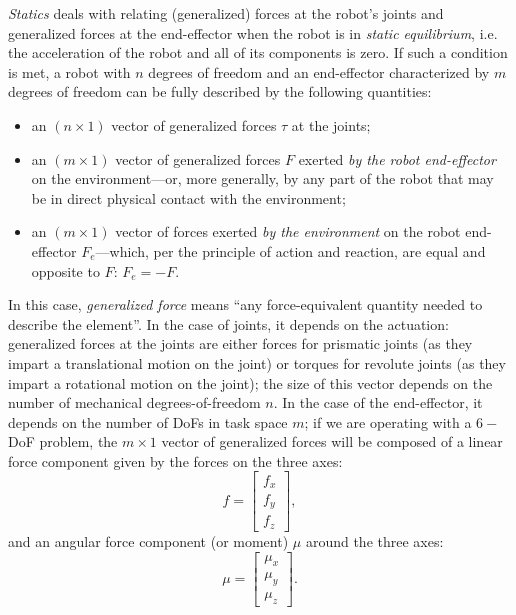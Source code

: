 \textsl{Statics} deals with relating (generalized) forces at the robot's joints and generalized forces at the end-effector when the robot is in \textsl{static equilibrium}, i.e. the acceleration of the robot and all of its components is zero.
If such a condition is met, a robot with $n$ degrees of freedom and an end-effector characterized by $m$ degrees of freedom can be fully described by the following quantities:
\begin{itemize}
    \item an $\left( n \times 1 \right)$ vector of generalized forces $\tau$ at the joints;
    \item an $\left( m \times 1 \right)$ vector of generalized forces $F$ exerted \textsl{by the robot end-effector} on the environment---or, more generally, by any part of the robot that may be in direct physical contact with the environment;
    \item an $\left( m \times 1 \right)$ vector of forces exerted \textsl{by the environment} on the robot end-effector $F_e$---which, per the principle of action and reaction, are equal and opposite to $F$: $F_e=-F$.
\end{itemize}
In this case, \textsl{generalized force} means ``any force-equivalent quantity needed to describe the element''.
In the case of joints, it depends on the actuation: generalized forces at the joints are either forces for prismatic joints (as they impart a translational motion on the joint) or torques for revolute joints (as they impart a rotational motion on the joint); the size of this vector depends on the number of mechanical degrees-of-freedom $n$.
In the case of the end-effector, it depends on the number of DoFs in task space $m$; if we are operating with a $6-$DoF problem, the $m \times 1$ vector of generalized forces will be composed of a linear force component given by the forces on the three axes:
\begin{equation}
f=\left[\begin{array}{c}
f_x\\
f_y\\
f_z
\end{array}
\right],
\end{equation}
and an angular force component (or moment) $\mu$ around the three axes:
\begin{equation}
\mu=\left[\begin{array}{c}
\mu_x\\
\mu_y\\
\mu_z
\end{array}
\right].
\end{equation}
